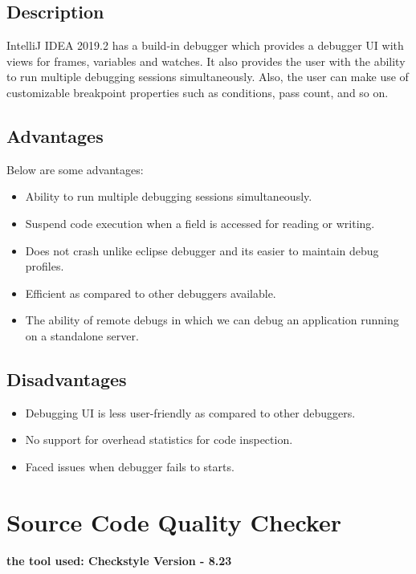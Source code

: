 \documentclass[a4paper,12pt]{article}
\begin{document}
\subsection{Description}
IntelliJ IDEA 2019.2 has a build-in debugger which provides a debugger UI with views for frames, variables and watches. It also provides the user with the ability to run multiple debugging sessions simultaneously. Also, the user can make use of customizable breakpoint properties such as conditions, pass count, and so on. 

\subsection{Advantages}
Below are some advantages:
\begin{itemize}
	\item Ability to run multiple debugging sessions simultaneously.
	\item Suspend code execution when a field is accessed for reading or writing.
	\item Does not crash unlike eclipse debugger and its easier to maintain debug profiles.
	\item Efficient as compared to other debuggers available.
	\item The ability of remote debugs in which we can debug an application running on a standalone server.
\end{itemize}

\subsection{Disadvantages}
\begin{itemize}
	\item Debugging UI is less user-friendly as compared to other debuggers.
	\item No support for overhead statistics for code inspection.
	\item Faced issues when debugger fails to starts.
\end{itemize}



\newpage

\section{\large Source Code Quality Checker}
\textbf{the tool used: Checkstyle Version - 8.23}
\end{document}

